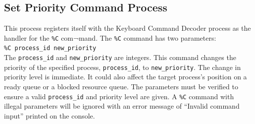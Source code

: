 \subsection{Set Priority Command Process}
\label{subsec_priority_proc}
This process registers itself with the Keyboard Command Decoder process as the handler for the \verb+%C+ com¬mand. The \verb+%C+ command has two parameters: \\
\verb+%C process_id new_priority+ \\
The \verb+process_id+ and \verb+new_priority+ are integers. This command changes the priority of the specified process, \verb+process_id+, to \verb+new_priority+. The change in priority level is immediate. It could also affect the target process’s position on a ready queue or a blocked resource queue. The parameters must be verified to ensure a valid \verb+process_id+ and priority level are given. A \verb+%C+ command with illegal parameters will be ignored with an error message of ``Invalid command input'' printed on the console. 
